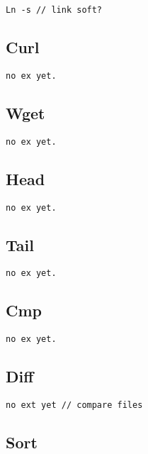 \begin{verbatim}
Ln -s // link soft?
\end{verbatim}

\subsection{Curl}

\begin{verbatim}
no ex yet.
\end{verbatim}

\subsection{Wget}

\begin{verbatim}
no ex yet.
\end{verbatim}

\subsection{Head}

\begin{verbatim}
no ex yet.
\end{verbatim}

\subsection{Tail}

\begin{verbatim}
no ex yet.
\end{verbatim}

\subsection{Cmp}

\begin{verbatim}
no ex yet.
\end{verbatim}

\subsection{Diff}

\begin{verbatim}
no ext yet // compare files
\end{verbatim}

\subsection{Sort}

